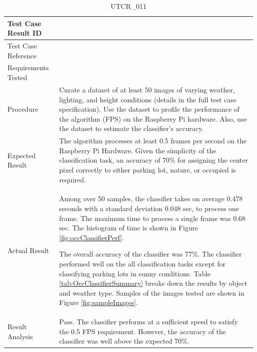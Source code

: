 \documentclass[12pt, titlepage]{article}
\begin{document}
\begin{table}[!h]
\begin{center}
\caption {UTCR\_011}
\label{tab:UTCR_011}
\begin{tabular}{ | m{3.2cm} | m{12.2cm} | } 
\hline
Test Case Result ID & \nameref{tab:UTCR_011} \\ 
\hline
Test Case Reference & \nameref{tab:UTC_011}  \\ 
\hline
Requirements Tested & \nameref{GEN_005} \\ 
\hline
Procedure &  Curate a dataset of at least 50 images of varying weather, lighting, and height conditions (details in the full test case specification). Use the dataset to profile the performance of the algorithm (FPS) on the Raspberry Pi hardware. Also, use the dataset to estimate the classifier's accuracy.  \\ 
\hline
Expected Result & The algorithm processes at least 0.5 frames per second on the Raspberry Pi Hardware. Given the simplicity of the classification task, an accuracy of 70\% for assigning the center pixel correctly to either parking lot, nature, or occupied is required. \\ 
\hline
Actual Result & Among over 50 samples, the classifier takes on average 0.478 seconds with a standard deviation 0.048 sec, to process one frame. The maximum time to process a single frame was 0.68 sec. The histogram of time is shown in Figure \ref{fig:occClassifierPerf}. 


The overall accuracy of the classifier was 77\%. The classifier performed well on the all classification tasks except for classifying parking lots in sunny conditions.  Table \ref{tab:OccClassifierSummary} breaks down the results by object and weather type. Samples of the images tested are shown in Figure \ref{fig:sampleImages}. \\ 
\hline
Result Analysis & Pass. The classifier performs at a sufficient speed to satisfy the 0.5 FPS requirement. However, the accuracy of the classifier was well above the expected 70\%. \\ 
\hline
\end{tabular}
\end{center}
\end{table}
\end{document}
